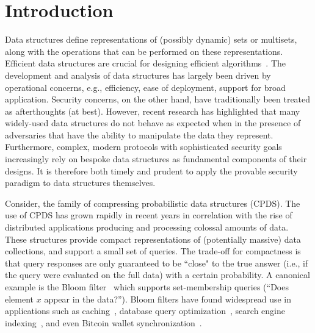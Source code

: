 \chapter{Introduction}

Data structures define representations of (possibly dynamic) sets or multisets, along with the operations that can be performed on these representations. Efficient data structures are crucial for designing efficient algorithms~\cite{clrs}. The development and analysis of data structures has largely been driven by operational concerns, e.g., efficiency, ease of deployment, support for broad application. Security concerns, on the other hand, have traditionally been treated as afterthoughts (at best). However, recent research has highlighted that many widely-used data structures do not behave as expected when in the presence of adversaries that have the ability to manipulate the data they represent. Furthermore, complex, modern protocols with sophisticated security goals increasingly rely on bespoke data structures as fundamental components of their designs. It is therefore both timely and prudent to apply the provable security paradigm to data structures themselves.


Consider, the family of compressing probabilistic data structures (CPDS). The use of CPDS has grown rapidly in recent years in correlation with the rise of distributed applications producing and processing colossal amounts of data. These structures provide compact representations of (potentially massive) data collections, and support a small set of queries.  The trade-off for compactness is that query responses are only guaranteed to be ``close" to the true answer (i.e., if the query were evaluated on the full data) with a certain probability. A canonical example is the Bloom filter~\cite{bloom1970space} which supports set-membership queries (``Does element $x$ appear in the data?'').  Bloom filters have found widespread use in applications such as caching~\cite{maggs2015}, database query optimization~\cite{dean2006}, search engine indexing~\cite{goodwin2017bitfunnel}, and even Bitcoin wallet synchronization~\cite{bip-0037}.

